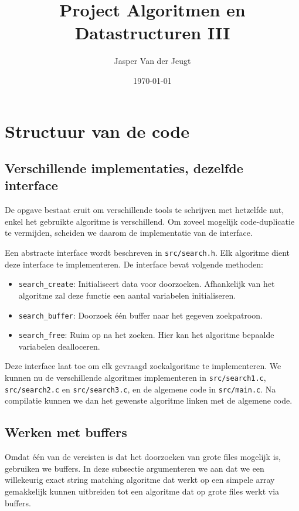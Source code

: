 \documentclass[a4paper,11pt]{article}
\title{Project Algoritmen en Datastructuren III}
\author{Jasper Van der Jeugt}
\date{\today}
\begin{document}
\maketitle
\tableofcontents

\section{Structuur van de code}

\subsection{Verschillende implementaties, dezelfde interface}

De opgave bestaat eruit om verschillende tools te schrijven met hetzelfde nut,
enkel het gebruikte algoritme is verschillend. Om zoveel mogelijk
code-duplicatie te vermijden, scheiden we daarom de implementatie van de
interface.

Een abstracte interface wordt beschreven in \verb#src/search.h#. Elk algoritme
dient deze interface te implementeren. De interface bevat volgende methoden:

\begin{itemize}
    \item \verb#search_create#: Initialiseert data voor doorzoeken. Afhankelijk
    van het algoritme zal deze functie een aantal variabelen initialiseren.
    \item \verb#search_buffer#: Doorzoek \'e\'en buffer naar het gegeven
    zoekpatroon.
    \item \verb#search_free#: Ruim op na het zoeken. Hier kan het algoritme
    bepaalde variabelen dealloceren.
\end{itemize}

Deze interface laat toe om elk gevraagd zoekalgoritme te implementeren. We
kunnen nu de verschillende algoritmes implementeren in \verb#src/search1.c#,
\verb#src/search2.c# en \verb#src/search3.c#, en de algemene code in
\verb#src/main.c#. Na compilatie kunnen we dan het gewenste algoritme linken met
de algemene code.

\subsection{Werken met buffers}

Omdat \'e\'en van de vereisten is dat het doorzoeken van grote files mogelijk
is, gebruiken we buffers. In deze subsectie argumenteren we aan dat we een
willekeurig exact string matching algoritme dat werkt op een simpele array
gemakkelijk kunnen uitbreiden tot een algoritme dat op grote files werkt via
buffers.
\end{document}
